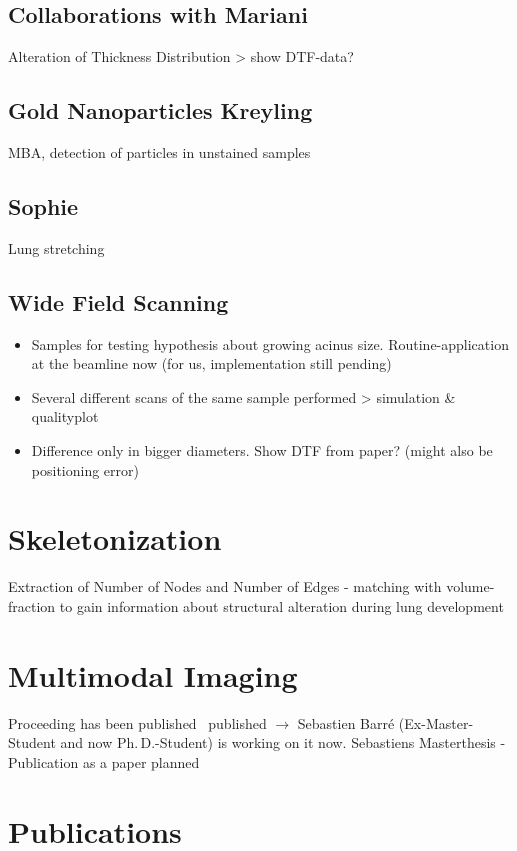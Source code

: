 \documentclass[a4paper,twoside,english,DIV=calc]{scrartcl}
\begin{document}
\subsection{Collaborations with Mariani}
Alteration of Thickness Distribution > show DTF-data?

\subsection{Gold Nanoparticles Kreyling}
MBA, detection of particles in unstained samples

\subsection{Sophie}
Lung stretching

\subsection{Wide Field Scanning}
\begin{itemize}
\item Samples for testing hypothesis about growing acinus size. Routine-application at the beamline now (for us, implementation still pending)
\item Several different scans of the same sample performed > simulation \& qualityplot
\item Difference only in bigger diameters. Show DTF from paper? (might also be positioning error)
\end{itemize}

\section{Skeletonization}
Extraction of Number of Nodes and Number of Edges - matching with volume-fraction to gain information about structural alteration during lung development

\section{Multimodal Imaging}
Proceeding has been published~\cite{Haberthuer2009} published $\rightarrow$ Sebastien Barré (Ex-Master-Student and now Ph.\,D.-Student) is working on it now. Sebastiens Masterthesis - Publication as a paper planned

\section{Publications}
\end{document}

